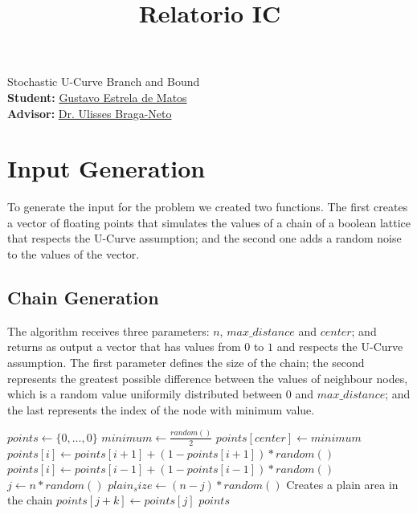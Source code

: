 \documentclass[12pt]{article}
\title{Relatorio IC}
\begin{document}
\begin{center}
{\Large Stochastic U-Curve Branch and Bound \\}
\bigskip
{\bf Student:} \href{mailto:estrela.gustavo.matos@gmail.com}{Gustavo Estrela de Matos} \\
        {\bf Advisor:} \href{mailto:ulisses@ece.tamu.edu}{Dr. Ulisses Braga-Neto}
\end{center}

\section{Input Generation}
To generate the input for the problem we created two functions. The first creates a vector of floating points that simulates the values of a chain of a boolean lattice that respects the U-Curve assumption; and the second one adds a random noise to the values of the vector.

\subsection{Chain Generation}
The algorithm receives three parameters: $n$, $max\_distance$ and $center$; and returns as output a vector that has values from $0$ to $1$ and respects the U-Curve assumption. The first parameter defines the size of the chain; the second represents the greatest possible difference between the values of neighbour nodes, which is a random value uniformily distributed between $0$ and $max\_distance$; and the last represents the index of the node with minimum value.

\begin{algorithm}[t]
\caption{U-Curve Input Creator}
\begin{algorithmic}[1]
    \State $points \gets \{0, ..., 0\}$
    \State $minimum \gets \frac{random ()}{2}$
    \State $points[center] \gets minimum$
    \State
        \State $points[i] \gets points[i + 1] + (1 - points[i + 1]) * random ()$
    \EndFor
        \State $points[i] \gets points[i - 1] + (1 - points[i - 1]) * random ()$
    \EndFor
    \State
    \State $j \gets n * random ()$
    \State $plain_size \gets (n - j) * random ()$
     \Comment Creates a plain area in the chain
        \State $points[j + k] \gets points[j]$
    \EndFor
    \Return $points$
\EndProcedure
\end{algorithmic}
\end{algorithm}
\end{document}
